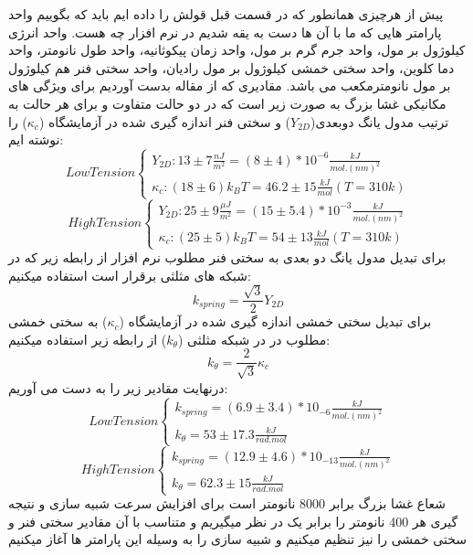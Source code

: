 \documentclass[12pt,onecolumn,a4paper]{report}
\begin{document}
پیش از هرچیزی همانطور که در قسمت قبل قولش را داده ایم باید که بگوییم واحد پارامتر هایی که ما با آن ها دست به یقه شدیم در نرم افزار چه هست.  واحد انرژی کیلوژول بر مول، واحد جرم گرم بر مول، واحد زمان پیکوثانیه، واحد طول نانومتر، واحد دما کلوین، واحد سختی خمشی کیلوژول بر مول رادیان، واحد سختی فنر هم کیلوژول بر مول نانومترمکعب می باشد.
مقادیری  که از مقاله بدست آوردیم برای ویژگی های مکانیکی غشا بزرگ به صورت زیر است که در دو حالت متفاوت و برای هر حالت به ترتیب مدول یانگ دوبعدی(\begin{math} Y_{2D} \end{math}) و سختی فنر اندازه گیری شده در آزمایشگاه (\begin{math} \kappa_c \end{math}) را نوشته ایم:
\[ Low Tension 
  \begin{cases}
    Y_{2D} : 13 \pm 7 \frac{nJ}{m^2} = (8 \pm 4) * 10^{-6} \frac{kJ}{mol.(nm)^2}\\
    \kappa_c : (18 \pm 6)k_{B}T = 46.2 \pm 15 \frac{kJ}{mol}    (T=310k)
  \end{cases}
\]
\[ High Tension 
  \begin{cases}
    Y_{2D} : 25 \pm 9 \frac{\mu J}{m^2} = (15 \pm 5.4) * 10^{-3}\frac{ kJ}{mol.(nm)^2}\\
    \kappa_c : (25 \pm 5)k_{B}T = 54 \pm 13 \frac{kJ}{mol}    (T=310k)
  \end{cases}
\]
برای تبدیل مدول یانگ دو بعدی به سختی فنر مطلوب نرم افزار از رابطه  زیر که در شبکه های مثلثی برقرار است استفاده میکنیم:
$$
k_{spring} = \frac{\sqrt{3}}{2}Y_{2D}
$$
برای تبدیل سختی خمشی اندازه گیری شده در آزمایشگاه (\begin{math} \kappa_c \end{math}) به سختی خمشی مطلوب در  در شبکه مثلثی (\begin{math} k_\theta \end{math}) از رابطه زیر استفاده میکنیم:
$$
k_\theta = \frac{2}{\sqrt{3}}\kappa_c
$$
درنهایت مقادیر زیر را به دست می آوریم:
\[ Low Tension 
  \begin{cases}
    k_{spring} = (6.9 \pm 3.4)*10_{-6} \frac{kJ}{mol.(nm)^2}\\
    k_\theta = 53 \pm 17.3 \frac{kJ}{rad.mol}
  \end{cases}
\]
\[ High Tension 
  \begin{cases}
    k_{spring} = (12.9 \pm 4.6)*10_{-13} \frac{kJ}{mol.(nm)^2}\\
    k_\theta = 62.3 \pm 15 \frac{kJ}{rad.mol}
  \end{cases}
\]
شعاع غشا بزرگ برابر 8000 نانومتر است برای افزایش سرعت شبیه سازی و نتیجه گیری هر 400 نانومتر را برابر یک در نظر میگیریم و متناسب با آن مقادیر سختی فنر و سختی خمشی را نیز تنظیم میکنیم و شبیه سازی را به وسیله این پارامتر ها آغاز میکنیم
\end{document}
